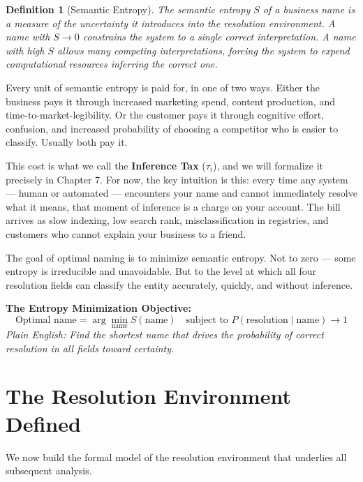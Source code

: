 \documentclass[12pt, openany]{book}
\theoremstyle{thmstyle}
\theoremstyle{defstyle}
\newtheorem{definition}{Definition}[chapter]
\newcommand{\taui}{\tau_i}
\begin{document}
\begin{definition}[Semantic Entropy]
The semantic entropy $S$ of a business name is a measure of the uncertainty it introduces into the resolution environment. A name with $S \to 0$ constrains the system to a single correct interpretation. A name with high $S$ allows many competing interpretations, forcing the system to expend computational resources inferring the correct one.
\end{definition}

Every unit of semantic entropy is paid for, in one of two ways. Either the business pays it through increased marketing spend, content production, and time-to-market-legibility. Or the customer pays it through cognitive effort, confusion, and increased probability of choosing a competitor who is easier to classify. Usually both pay it.

This cost is what we call the \textbf{Inference Tax} ($\taui$), and we will formalize it precisely in Chapter 7. For now, the key intuition is this: every time any system --- human or automated --- encounters your name and cannot immediately resolve what it means, that moment of inference is a charge on your account. The bill arrives as slow indexing, low search rank, misclassification in registries, and customers who cannot explain your business to a friend.

\vspace{8pt}

The goal of optimal naming is to minimize semantic entropy. Not to zero --- some entropy is irreducible and unavoidable. But to the level at which all four resolution fields can classify the entity accurately, quickly, and without inference.

\begin{equationbox}
\textbf{The Entropy Minimization Objective:}
\[
\text{Optimal name} = \arg\min_{\text{name}} S(\text{name}) \quad \text{subject to } P(\text{resolution} \mid \text{name}) \to 1
\]
\textit{Plain English: Find the shortest name that drives the probability of correct resolution in all fields toward certainty.}
\end{equationbox}

\section{The Resolution Environment Defined}

We now build the formal model of the resolution environment that underlies all subsequent analysis.
\end{document}
